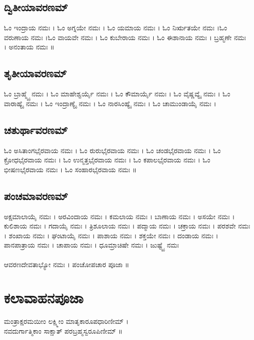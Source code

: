 \subsection{ದ್ವಿತೀಯಾವರಣಮ್}
ಓಂ ಇಂದ್ರಾಯ ನಮಃ । ಓಂ ಅಗ್ನಯೇ ನಮಃ । ಓಂ ಯಮಾಯ ನಮಃ । ಓಂ ನಿರ್ಋತಯೇ ನಮಃ ।ಓಂ ವರುಣಾಯ ನಮಃ ।ಓಂ ವಾಯವೇ ನಮಃ । ಓಂ ಕುಬೇರಾಯ ನಮಃ । ಓಂ ಈಶಾನಾಯ ನಮಃ । ಬ್ರಹ್ಮಣೇ ನಮಃ । ಅನಂತಾಯ ನಮಃ ॥\\
\subsection{ತೃತೀಯಾವರಣಮ್}
ಓಂ ಬ್ರಾಹ್ಮ್ಯೈ ನಮಃ । ಓಂ ಮಾಹೇಶ್ವರ್ಯೈ ನಮಃ । ಓಂ ಕೌಮಾರ್ಯೈ ನಮಃ । ಓಂ ವೈಷ್ಣವ್ಯೈ ನಮಃ । ಓಂ ವಾರಾಹ್ಯೈ ನಮಃ । ಓಂ ಇಂದ್ರಾಣ್ಯೈ ನಮಃ । ಓಂ ನಾರಸಿಂಹ್ಯೈ ನಮಃ । ಓಂ ಚಾಮುಂಡಾಯೈ ನಮಃ ।\\

\subsection{ಚತುರ್ಥಾವರಣಮ್}
ಓಂ ಅಸಿತಾಂಗಭೈರವಾಯ ನಮಃ । ಓಂ ರುರುಭೈರವಾಯ ನಮಃ । ಓಂ ಚಂಡಭೈರವಾಯ ನಮಃ । ಓಂ ಕ್ರೋಧಭೈರವಾಯ ನಮಃ । ಓಂ ಉನ್ಮತ್ತಭೈರವಾಯ ನಮಃ । ಓಂ ಕಪಾಲಭೈರವಾಯ ನಮಃ । ಓಂ ಭೀಷಣಭೈರವಾಯ ನಮಃ । ಓಂ ಸಂಹಾರಭೈರವಾಯ ನಮಃ  ॥\\
\subsection{ಪಂಚಮಾವರಣಮ್}
ಅಕ್ಷಮಾಲಾಯೈ ನಮಃ ।
ಅರವಿಂದಾಯ ನಮಃ । ಕಮಲಾಯ ನಮಃ । ಬಾಣಾಯ ನಮಃ । ಅಸಯೇ ನಮಃ । ಕುಲಿಶಾಯ ನಮಃ । ಗದಾಯೈ ನಮಃ । ತ್ರಿಶೂಲಾಯ ನಮಃ । ಪದ್ಮಾಯ ನಮಃ । ಚಕ್ರಾಯ ನಮಃ । ಪರಶವೇ ನಮಃ । ಶಂಖಾಯ ನಮಃ । ಘಂಟಾಯೈ ನಮಃ । ಪಾಶಾಯ ನಮಃ । ಶಕ್ತಯೇ ನಮಃ । ದಂಡಾಯ ನಮಃ । ಪಾನಪಾತ್ರಾಯ ನಮಃ । ಚಾಪಾಯ ನಮಃ । ಧೂಮ್ರಾಚಿಷೇ ನಮಃ । ಜುಷ್ಟ್ಯೈ ನಮಃ\\
\\
ಆವರಣದೇವತಾಭ್ಯೋ ನಮಃ । ಪಂಚೋಪಚಾರ ಪೂಜಾ ॥

\section{ಕಲಾವಾಹನಪೂಜಾ}
ಮಂತ್ರಾಕ್ಷರಮಯೀಂ ಲಕ್ಷ್ಮೀಂ ಮಾತೃಕಾರೂಪಧಾರಿಣೀಮ್ ।\\
ನವದುರ್ಗಾತ್ಮಿಕಾಂ ಸಾಕ್ಷಾತ್ ಪರಬ್ರಹ್ಮಸ್ವರೂಪಿಣೀಮ್ ॥

